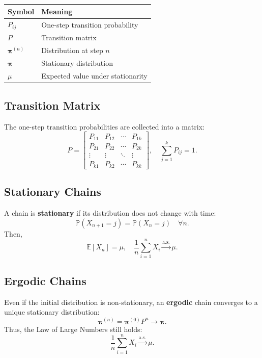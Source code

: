 \begin{center}
\begin{tabular}{ll}
\toprule
\textbf{Symbol} & \textbf{Meaning} \\
\midrule
$P_{ij}$ & One-step transition probability \\
$P$ & Transition matrix \\
$\boldsymbol{\pi}^{(n)}$ & Distribution at step $n$ \\
$\boldsymbol{\pi}$ & Stationary distribution \\
$\mu$ & Expected value under stationarity \\
\bottomrule
\end{tabular}
\end{center}

\subsection*{Transition Matrix}

The one-step transition probabilities are collected into a matrix:
\[
P =
\begin{bmatrix}
P_{11} & P_{12} & \cdots & P_{1k} \\
P_{21} & P_{22} & \cdots & P_{2k} \\
\vdots & \vdots & \ddots & \vdots \\
P_{k1} & P_{k2} & \cdots & P_{kk}
\end{bmatrix}, \quad
\sum_{j=1}^{k} P_{ij} = 1.
\]




\subsection*{Stationary Chains}

A chain is \textbf{stationary} if its distribution does not change with time:
\[
\mathbb{P}(X_{n+1} = j) = \mathbb{P}(X_n = j) \quad \forall n.
\]
Then,
\[
\mathbb{E}[X_n] = \mu, \quad
\frac{1}{n}\sum_{i=1}^{n} X_i \xrightarrow{\text{a.s.}} \mu.
\]

\subsection*{Ergodic Chains}

Even if the initial distribution is non-stationary, an \textbf{ergodic} chain converges to a unique stationary distribution:
\[
\boldsymbol{\pi}^{(n)} = \boldsymbol{\pi}^{(0)} P^n \to \boldsymbol{\pi}.
\]
Thus, the Law of Large Numbers still holds:
\[
\frac{1}{n} \sum_{i=1}^{n} X_i \xrightarrow{\text{a.s.}} \mu.
\]


